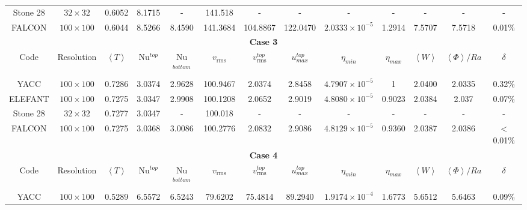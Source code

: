 \begin{table}[H]
{\begin{tabular}{|cc|ccccccccccc|}
     \rowcolor{gray!25!}
     Stone 28 & $32\times32$ & 0.6052 & 8.1715 & - & 141.518 & - & - & - & - & - & - & - \\
     FALCON & $100\times100$ & 0.6044 & 8.5266 & 8.4590 & 141.3684 & 104.8867 & 122.0470 & $2.0333\times10^{-5}$ & 1.2914 & 7.5707 & 7.5718 & 0.01\% \\
     \midrule
     \multicolumn{13}{|c|}{\textbf{Case 3}} \\
     \midrule
     Code & Resolution & $\left\langle T \right\rangle$ & Nu$^{top}$ & Nu$^{bottom}$ & $v_{\textrm{rms}}$ & $v_{\textrm{rms}}^{top}$& $u_{max}^{top}$& $\eta_{min}$
     & $\eta_{max}$ & $\left\langle W \right\rangle$ & $\left\langle \Phi \right\rangle/Ra$ & $\delta$ \\
     \hline
     \rowcolor{gray!25!} 
     YACC & $100\times100$ & 0.7286 & 3.0374 & 2.9628 & 100.9467 & 2.0374 & 2.8458 & $4.7907\times10^{-5}$ & 1 & 2.0400 & 2.0335 & 0.32\% \\
      ELEFANT & $100\times100$ & 0.7275 & 3.0347 & 2.9908 & 100.1208 & 2.0652 & 2.9019 & $4.8080\times10^{-5}$ & 0.9023 & 2.0384 & 2.037 & 0.07\% \\
      \rowcolor{gray!25!}
      Stone 28 & $32\times32$ & 0.7277 & 3.0347 & - & 100.018 & - & - & - & - & - & - & - \\
      FALCON & $100\times100$ & 0.7275 & 3.0368 & 3.0086 & 100.2776 & 2.0832 & 2.9086 & $4.8129\times10^{-5}$ & 0.9360 & 2.0387 & 2.0386 & $<$0.01\% \\
      \midrule
      \multicolumn{13}{|c|}{\textbf{Case 4}} \\
      \midrule
      Code & Resolution & $\left\langle T \right\rangle$ & Nu$^{top}$ & Nu$^{bottom}$ & $v_{\textrm{rms}}$ & $v_{\textrm{rms}}^{top}$& $u_{max}^{top}$& $\eta_{min}$
      & $\eta_{max}$ & $\left\langle W \right\rangle$ & $\left\langle \Phi \right\rangle/Ra$ & $\delta$ \\
      \hline
      \rowcolor{gray!25!} 
      YACC & $100\times100$ & 0.5289 & 6.5572 & 6.5243 & 79.6202 & 75.4814 & 89.2940 & $1.9174\times10^{-4}$ & 1.6773 & 5.6512 & 5.6463 & 0.09\% \\

\end{tabular}}
\end{table}
